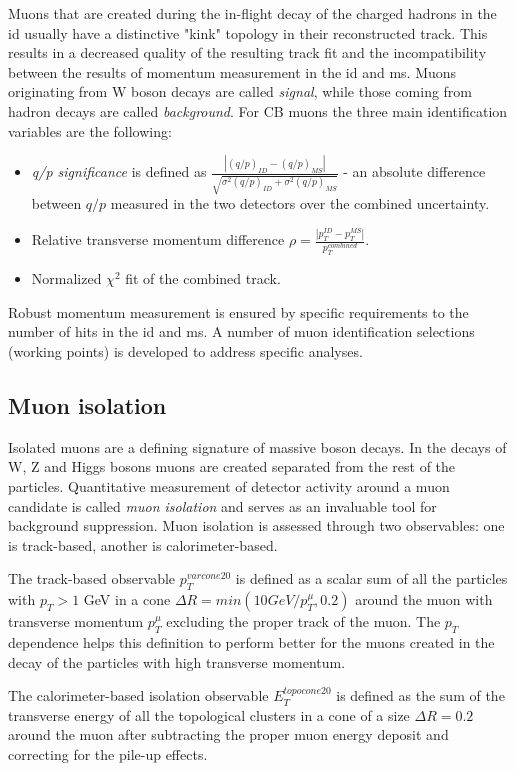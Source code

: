      Muons that are created during the in-flight decay of the charged hadrons in the \gls{id} usually have a distinctive "kink" topology in their reconstructed track. This results in a decreased quality of the resulting track fit and the incompatibility between the results of momentum measurement in the \gls{id} and \gls{ms}. Muons originating from W boson decays are called \textit{signal}, while those coming from hadron decays are called \textit{background}. For CB muons the three main identification variables are the following:
     \begin{itemize}
    	\item \textit{q/p significance} is defined as $\frac{|(q/p)_{ID}-(q/p)_{MS}|}{\sqrt{\sigma^2(q/p)_{ID}+\sigma^2(q/p)_{MS}}}$ - an absolute difference between $q/p$ measured in the two detectors over the combined uncertainty.
    	\item Relative transverse momentum difference $\rho = \frac{|p_T^{ID}-p_T^{MS}|}{p_T^{combined}}$.
    	\item Normalized $\chi^2$ fit of the combined track.
 	\end{itemize}
 	Robust momentum measurement is ensured by specific requirements to the number of hits in the \gls{id} and \gls{ms}. A number of muon identification selections (working points) is developed to address specific analyses. 
     \subsection{Muon isolation}   
     Isolated muons are a defining signature of massive boson decays. In the decays of W, Z and Higgs bosons muons are created separated from the rest of the particles. Quantitative measurement of detector activity around a muon candidate is called \textit{muon isolation} and serves as an invaluable tool for background suppression. Muon isolation is assessed through two observables: one is track-based, another is calorimeter-based. 
     
     The track-based observable $p_T^{varcone20}$ is defined as a scalar sum of all the particles with $p_T>1$ GeV in a cone $\Delta R=min(10 GeV/p_T^{\mu},0.2)$ around the muon with transverse momentum $p_T^{\mu}$ excluding the proper track of the muon. The $p_T$ dependence helps this definition to perform better for the muons created in the decay of the particles with high transverse momentum.
     
     The calorimeter-based isolation observable $E_T^{topocone20}$ is defined as the sum of the transverse energy of all the topological clusters in a cone of a size $\Delta R = 0.2$ around the muon after subtracting the proper muon energy deposit and correcting for the pile-up effects.
     
